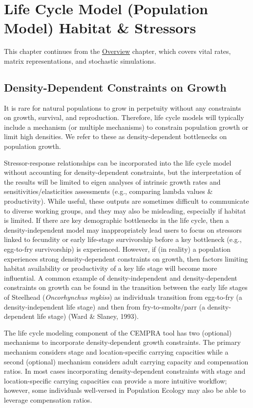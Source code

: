 \documentclass[
  letterpaper,
  DIV=11,
  numbers=noendperiod]{scrreprt}
\begin{document}
\chapter{Life Cycle Model (Population Model) Habitat \&
Stressors}\label{life-cycle-model-population-model-habitat-stressors}

This chapter continues from the
\hyperref[life-cycle-model-population-model-overview]{Overview} chapter,
which covers vital rates, matrix representations, and stochastic
simulations.

\section{Density-Dependent Constraints on
Growth}\label{density-dependent-constraints-on-growth}

It is rare for natural populations to grow in perpetuity without any
constraints on growth, survival, and reproduction. Therefore, life cycle
models will typically include a mechanism (or multiple mechanisms) to
constrain population growth or limit high densities. We refer to these
as density-dependent bottlenecks on population growth.

Stressor-response relationships can be incorporated into the life cycle
model without accounting for density-dependent constraints, but the
interpretation of the results will be limited to eigen analyses of
intrinsic growth rates and sensitivities/elasticities assessments (e.g.,
comparing lambda values \& productivity). While useful, these outputs
are sometimes difficult to communicate to diverse working groups, and
they may also be misleading, especially if habitat is limited. If there
are key demographic bottlenecks in the life cycle, then a
density-independent model may inappropriately lead users to focus on
stressors linked to fecundity or early life-stage survivorship before a
key bottleneck (e.g., egg-to-fry survivorship) is experienced. However,
if (in reality) a population experiences strong density-dependent
constraints on growth, then factors limiting habitat availability or
productivity of a key life stage will become more influential. A common
example of density-independent and density-dependent constraints on
growth can be found in the transition between the early life stages of
Steelhead (\emph{Oncorhynchus mykiss}) as individuals transition from
egg-to-fry (a density-independent life stage) and then from
fry-to-smolts/parr (a density-dependent life stage) (Ward \& Slaney,
1993).

The life cycle modeling component of the CEMPRA tool has two (optional)
mechanisms to incorporate density-dependent growth constraints. The
primary mechanism considers stage and location-specific carrying
capacities while a second (optional) mechanism considers adult carrying
capacity and compensation ratios. In most cases incorporating
density-dependent constraints with stage and location-specific carrying
capacities can provide a more intuitive workflow; however, some
individuals well-versed in Population Ecology may also be able to
leverage compensation ratios.
\end{document}
